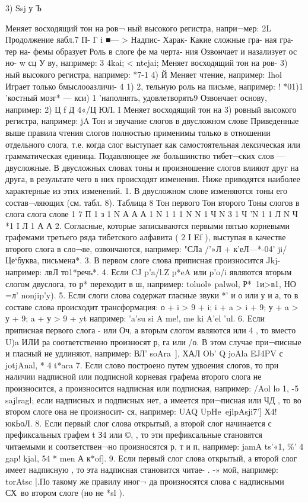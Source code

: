 3) Ssj     у Ъ{	Меняет восходящий тон на ров¬
ный высокого регистра, напри¬мер: 2L
Продолжение яабл.7
П-	Г		 	i 	 ■— >
Надпис- Харак- Какие сложные гра-
ная гра- тер на- фемы образует	Роль в слоге
фе ма черта-
		 ния		
Озвончает и назализует ос но-
w сц У	ву, например: 3  4kai; < ntejai;
Меняет восходящий тон на ров-
3)	 	ный высокого регистра, например:
*7-1
4)	Й	Меняет чтение, например:
Ihol
Играет только бмыслооазличи-
 4	1)	    2,   тельную роль на письме, например:
!	*01)1 'костный мозг* —
кси) 1 'наполнять, удовлетворять9
Озвончает основу, например:
2)	Ц f   Д	4«/Ц ЮЛ.
I Меняет восходящий тон на
3)	ровный	высокого регистра,
например:   jA
Тон и звучание слогов в двусложном слове Приведенные выше правила чтения слогов полностью применимы только в отношении отдельного слога, т.е. когда слог выступает как самостоятельная лексическая или грамматическая единица. Подавляющее же большинство тибет¬ских слов --- двусложные. В двусложных словах тоны и произношение слогов влияют друг на друга, в результате чего в них происходят изменения. Ниже приводятся наиболее характерные из этих изменений.
1.	В двусложном слове изменяются тоны его состав¬ляющих (см. табл. 8).
Таблица 8
Тон первого	Тон второго Тоны слогов в
слога	слога	слове
1	7	П
1	з	1	N
	А	А	А 1
N	1	1	1
N	N	1	Ч
N	3	1	Ч
'N	1	 1
Л	N	 Ч
*1 I Л 1 А А
2.	Согласные, которые записываются первыми пятью корневыми графемами третьего ряда тибетского алфавита
(	  2    I Ef ), выступая в качестве второго слога в сло¬ве, озвончаются, например: "СЛа /'»Л +	к’еЛ—*-04'
ji/Це‘буква, письмена*.
3.	В первом слоге слова приписная произносится Jkj-например:	лвЛ то1*речь*.
4.	Если CJ p’a/l.Z  p*eA или p’o/i являются вторым слогом двуслога, то р* переходит в ш, например:
  toluol»	  palwol,	Р*~1и>в1, НО =л'
  nonjip'y).
5.	Если слоги слова содержат гласные звуки *' и о или у и а, то в составе слова происходит трансформация: о + i > 9 + i; i + a > i + 9; у + a > у + 9; a + у > 9 + yt например:
'a'su si A me!,	me ki   A’el ’ul.
6.	Если приписная первого слога -   или Оч, а вторым слогом являются   или  4 , то вместо U)a ИЛИ ра соответственно произносят р, га или /о. В этом случае при¬писные   и гласный не удлиняют, например: ВЛ'   soAra~], ХАЛ Ob' Q joAla EJ4PV с jotjAnal,   * 4 t*ara
7.	Если слово построено путем удвоения слогов, то
при наличии надписной или подписной корневая графема второго слога не произносится, а произносится надписная или подписная, например:	/Aol lo 1,    -5 
sajlragl; если надписных и подписных нет, а имеется при¬писная   или ЧД , то во втором слоге она не произносит- ся, например:	UAQ UpHe\,	ejlpAsji7']
Х4!   юкЬоЛ.
8.	Если первый слог слова открытый, а второй слог
начинается с префиксальных графем t З4 или ©, , то эти префиксальные становятся читаемыми и соответствен¬но произносятся р, т и п, например:	jamA
ts'«1, \%' 4   gap! kjal,	54 *	men А к*of].
9.	Если первый слог слова открытый, а второй слог
имеет надписную , то эта надписная становится читае-
 . -»
мой, например:	torAtsc |.По такому же правилу иног¬
да произносятся слова с надписными СХ\ во втором слоге (но не *sl ).

}
